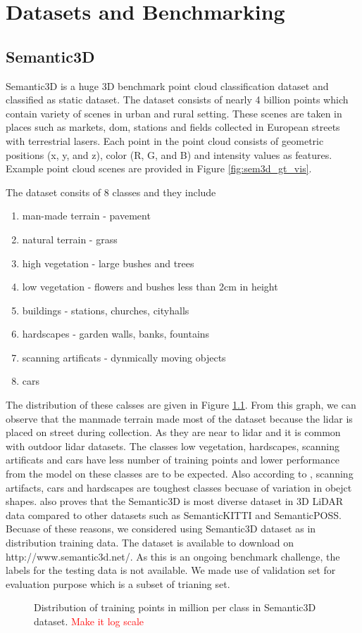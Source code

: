

    \chapter{Datasets and Benchmarking}
    \section{Semantic3D}
Semantic3D is a huge 3D benchmark point cloud classification dataset and classified as static dataset.
The dataset consists of nearly 4 billion points which contain variety of scenes in urban and rural setting.
These scenes are taken in places such as markets, dom, stations and fields collected in European streets with terrestrial lasers.
Each point in the point cloud consists of geometric positions (x, y, and z), color (R, G, and B) and intensity values as features.
Example point cloud scenes are provided in Figure \ref{fig:sem3d_gt_vis}. 

The dataset consits of 8 classes and they include
\begin{enumerate}
    \item man-made terrain - pavement
    \item natural terrain - grass
    \item high vegetation - large bushes and trees
    \item low vegetation - flowers and bushes less than 2cm in height
    \item buildings - stations, churches, cityhalls
    \item hardscapes - garden walls, banks, fountains
    \item scanning artificats - dynmically moving objects
    \item cars
\end{enumerate}
The distribution of these calsses are given in Figure \ref{fig:sem3ddist}.
From this graph, we can observe that the manmade terrain made most of the dataset because the lidar is placed on street during collection.
As they are near to lidar and it is common with outdoor lidar datasets.
The classes low vegetation, hardscapes, scanning artificats and cars have less number of training points and lower performance from the model on these classes are to be expected.
Also according to \cite{hackel2017semantic3d}, scanning artifacts, cars and hardscapes are toughest classes becuase of variation in obejct shapes.
\cite{survey3d} also proves that the Semantic3D is most diverse dataset in 3D LiDAR data compared to other datasets such as SemanticKITTI and SemanticPOSS.
Becuase of these reasons, we considered using Semantic3D dataset as in distribution training data.
The dataset is available to download on http://www.semantic3d.net/. 
As this is an ongoing benchmark challenge, the labels for the testing data is not available.
We made use of validation set for evaluation purpose which is a subset of trianing set.
\begin{figure}[h!]
    \centering
    
    \caption{Distribution of training points in million per class in Semantic3D dataset. \textcolor{red}{Make it log scale}}
    \label{fig:sem3ddist}
\end{figure}


